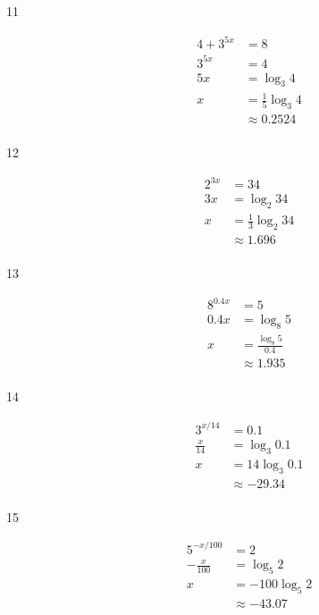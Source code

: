 \documentclass{exam}
\begin{document}
\begin{description}
      \item[11]
        \begin{align*}
          4 + 3^{5x} &= 8 \\
          3^{5x}     &= 4 \\
          5x         &= \log_3 4 \\
          x          &= \frac{1}{5} \log_3 4 \\
                     &\approx \boxed{0.2524} \\
        \end{align*}

      \item[12]
        \begin{align*}
          2^{3x} &= 34 \\
          3x     &= \log_2 34 \\
          x      &= \frac{1}{3} \log_2 34 \\
                 &\approx \boxed{1.696} \\
        \end{align*}

      \item[13]
        \begin{align*}
          8^{0.4x} &= 5 \\
          0.4x &= \log_8 5 \\
          x    &= \frac{\log_8 5}{0.4} \\
               &\approx \boxed{1.935} \\
        \end{align*}

      \item[14]
        \begin{align*}
          3^{x/14}     &= 0.1 \\
          \frac{x}{14} &= \log_3 0.1 \\
          x            &= 14 \log_3 0.1 \\
                       &\approx \boxed{-29.34} \\
        \end{align*}

      \item[15]
        \begin{align*}
          5^{-x/100}     &= 2 \\
          -\frac{x}{100} &= \log_5 2 \\
          x              &= -100 \log_5 2 \\
                         &\approx \boxed{-43.07} \\
        \end{align*}


\end{description}
\end{document}
